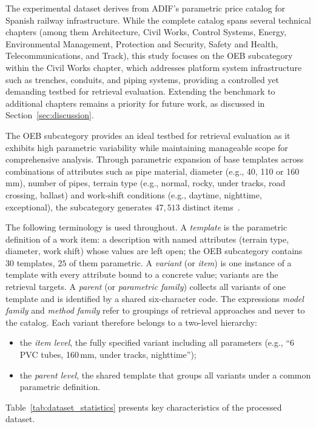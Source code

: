 \documentclass[preprint,review,12pt]{elsarticle}
\begin{document}
The experimental dataset derives from ADIF's parametric price catalog for Spanish railway infrastructure. While the complete catalog spans several technical chapters (among them Architecture, Civil Works, Control Systems, Energy, Environmental Management, Protection and Security, Safety and Health, Telecommunications, and Track), this study focuses on the OEB subcategory within the Civil Works chapter, which addresses platform system infrastructure such as trenches, conduits, and piping systems, providing a controlled yet demanding testbed for retrieval evaluation. Extending the benchmark to additional chapters remains a priority for future work, as discussed in Section~\ref{sec:discussion}.

The OEB subcategory provides an ideal testbed for retrieval evaluation as it exhibits high parametric variability while maintaining manageable scope for comprehensive analysis. Through parametric expansion of base templates across combinations of attributes such as pipe material, diameter (e.g., 40, 110 or 160\,mm), number of pipes, terrain type (e.g., normal, rocky, under tracks, road crossing, ballast) and work-shift conditions (e.g., daytime, nighttime, exceptional), the subcategory generates $47{,}513$ distinct items~\cite{bc3cat_dataset}.

The following terminology is used throughout. A \emph{template} is the parametric definition of a work item: a description with named attributes (terrain type, diameter, work shift) whose values are left open; the OEB subcategory contains $30$ templates, $25$ of them parametric. A \emph{variant} (or \emph{item}) is one instance of a template with every attribute bound to a concrete value; variants are the retrieval targets. A \emph{parent} (or \emph{parametric family}) collects all variants of one template and is identified by a shared six-character code. The expressions \emph{model family} and \emph{method family} refer to groupings of retrieval approaches and never to the catalog. Each variant therefore belongs to a two-level hierarchy:
\begin{itemize}
    \item the \emph{item level}, the fully specified variant including all parameters (e.g., ``6 PVC tubes, 160\,mm, under tracks, nighttime'');
    \item the \emph{parent level}, the shared template that groups all variants under a common parametric definition.
\end{itemize}

Table~\ref{tab:dataset_statistics} presents key characteristics of the processed dataset.
\end{document}
